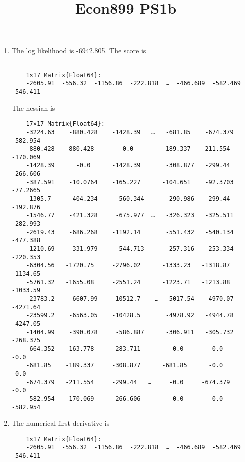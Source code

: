 \documentclass{article}
\title{Econ899 PS1b}
\begin{document}
\maketitle
\begin{enumerate}
\item
  The log likelihood is -6942.805.
  The score is
  \begin{lstlisting}

    1×17 Matrix{Float64}:
    -2605.91  -556.32  -1156.86  -222.818  …  -466.689  -582.469  -546.411
  \end{lstlisting}

  The hessian is
  \begin{lstlisting}
    17×17 Matrix{Float64}:
    -3224.63    -880.428    -1428.39   …   -681.85    -674.379    -582.954
    -880.428   -880.428       -0.0        -189.337   -211.554    -170.069
    -1428.39      -0.0      -1428.39       -308.877   -299.44     -266.606
    -387.591    -10.0764    -165.227      -104.651    -92.3703    -77.2665
    -1305.7     -404.234     -560.344      -290.986   -299.44     -192.876
    -1546.77    -421.328     -675.977  …   -326.323   -325.511    -282.993
    -2619.43    -686.268    -1192.14       -551.432   -540.134    -477.388
    -1210.69    -331.979     -544.713      -257.316   -253.334    -220.353
    -6304.56   -1720.75     -2796.02      -1333.23   -1318.87    -1134.65
    -5761.32   -1655.08     -2551.24      -1223.71   -1213.88    -1033.59
    -23783.2    -6607.99    -10512.7    …  -5017.54   -4970.07    -4271.64
    -23599.2    -6563.05    -10428.5       -4978.92   -4944.78    -4247.05
    -1404.99    -390.078     -586.887      -306.911   -305.732    -268.375
    -664.352   -163.778     -283.711        -0.0       -0.0        -0.0
    -681.85    -189.337     -308.877      -681.85      -0.0        -0.0
    -674.379   -211.554     -299.44   …     -0.0     -674.379      -0.0
    -582.954   -170.069     -266.606        -0.0       -0.0      -582.954
  \end{lstlisting}
  \item The numerical first derivative is
  \begin{lstlisting}
    1×17 Matrix{Float64}:
    -2605.91  -556.32  -1156.86  -222.818  …  -466.689  -582.469  -546.411
  \end{lstlisting}

\end{enumerate}
\end{document}

